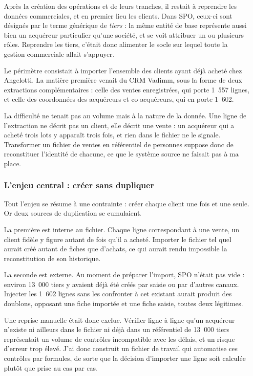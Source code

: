 Après la création des opérations et de leurs tranches, il restait à reprendre les données
commerciales, et en premier lieu les clients. Dans SPO, ceux-ci sont désignés par le terme
générique de \emph{tiers} : la même entité de base représente aussi bien un acquéreur
particulier qu'une société, et se voit attribuer un ou plusieurs rôles. Reprendre les tiers,
c'était donc alimenter le socle sur lequel toute la gestion commerciale allait s'appuyer.

Le périmètre consistait à importer l'ensemble des clients ayant déjà acheté chez Angelotti. La
matière première venait du CRM Vadimm, sous la forme de deux extractions complémentaires :
celle des ventes enregistrées, qui porte 1~557 lignes, et celle des coordonnées des acquéreurs
et co-acquéreurs, qui en porte 1~602.

La difficulté ne tenait pas au volume mais à la nature de la donnée. Une ligne de l'extraction
ne décrit pas un client, elle décrit une vente : un acquéreur qui a acheté trois lots y
apparaît trois fois, et rien dans le fichier ne le signale. Transformer un fichier de ventes en
référentiel de personnes suppose donc de reconstituer l'identité de chacune, ce que le système
source ne faisait pas à ma place.

\subsubsection{L'enjeu central : créer sans dupliquer}

Tout l'enjeu se résume à une contrainte : créer chaque client une fois et une seule. Or deux
sources de duplication se cumulaient.

La première est interne au fichier. Chaque ligne correspondant à une vente, un client fidèle y
figure autant de fois qu'il a acheté. Importer le fichier tel quel aurait créé autant de fiches
que d'achats, ce qui aurait rendu impossible la reconstitution de son historique.

La seconde est externe. Au moment de préparer l'import, SPO n'était pas vide : environ 13~000
tiers y avaient déjà été créés par saisie ou par d'autres canaux. Injecter les 1~602 lignes
sans les confronter à cet existant aurait produit des doublons, opposant une fiche importée et
une fiche saisie, toutes deux légitimes.

Une reprise manuelle était donc exclue. Vérifier ligne à ligne qu'un acquéreur n'existe ni
ailleurs dans le fichier ni déjà dans un référentiel de 13~000 tiers représentait un volume de
contrôles incompatible avec les délais, et un risque d'erreur trop élevé. J'ai donc construit un
fichier de travail qui automatise ces contrôles par formules, de sorte que la décision
d'importer une ligne soit calculée plutôt que prise au cas par cas.

